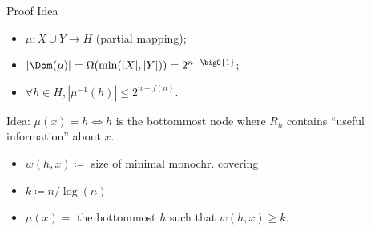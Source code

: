 \begin{frame}{Proof Idea}

    \begin{itemize}
        \item $\mu\colon X \cup Y \to H$ (partial mapping);
        \item $|\Dom(\mu)| = \Omega(\min(|X|, |Y|)) = 2^{n - \bigO{1}}$;
        \item $\forall h \in H, |\mu^{-1}(h)| \le 2^{n - f(n)}$.
    \end{itemize}

    \pause
    Idea: $\mu(x) = h \Leftrightarrow h$ is the bottommost node where $R_h$ contains ``useful
    information'' about $x$.

    \pause

    \begin{minipage}{0.38\linewidth}
        \centering
        
    \end{minipage}
    \begin{minipage}{0.58\linewidth}
        \pause
        \begin{itemize}
            \item $w(h, x) \coloneqq$ size of minimal monochr. covering
            \item $k \coloneqq n / \log(n)$
            \item $\mu(x) =$ the bottommost $h$ such that $w(h, x) \ge k$.
        \end{itemize}
    \end{minipage}

\end{frame}

